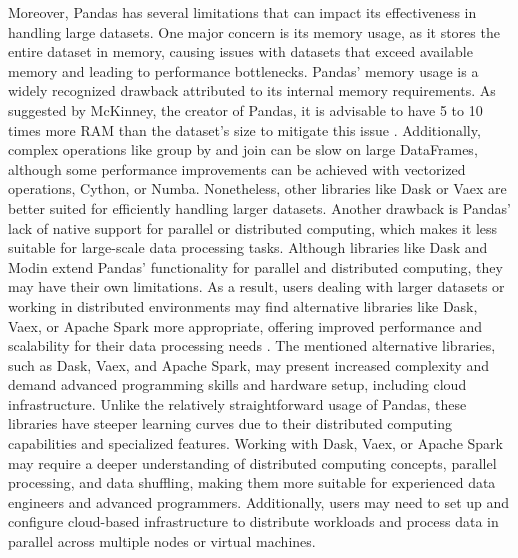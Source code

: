 Moreover, Pandas has several limitations that can impact its effectiveness in handling large datasets. One major concern is its memory usage, as it stores the entire dataset in memory, causing issues with datasets that exceed available memory and leading to performance bottlenecks. Pandas' memory usage is a widely recognized drawback attributed to its internal memory requirements. As suggested by McKinney, the creator of Pandas, it is advisable to have 5 to 10 times more RAM than the dataset's size to mitigate this issue \cite{sinthong2019aframe}. Additionally, complex operations like group by and join can be slow on large DataFrames, although some performance improvements can be achieved with vectorized operations, Cython, or Numba. Nonetheless, other libraries like Dask or Vaex are better suited for efficiently handling larger datasets. Another drawback is Pandas' lack of native support for parallel or distributed computing, which makes it less suitable for large-scale data processing tasks. Although libraries like Dask and Modin extend Pandas' functionality for parallel and distributed computing, they may have their own limitations. As a result, users dealing with larger datasets or working in distributed environments may find alternative libraries like Dask, Vaex, or Apache Spark more appropriate, offering improved performance and scalability for their data processing needs \cite{nelluri2021limitations}. The mentioned alternative libraries, such as Dask, Vaex, and Apache Spark, may present increased complexity and demand advanced programming skills and hardware setup, including cloud infrastructure. Unlike the relatively straightforward usage of Pandas, these libraries have steeper learning curves due to their distributed computing capabilities and specialized features. Working with Dask, Vaex, or Apache Spark may require a deeper understanding of distributed computing concepts, parallel processing, and data shuffling, making them more suitable for experienced data engineers and advanced programmers. Additionally, users may need to set up and configure cloud-based infrastructure to distribute workloads and process data in parallel across multiple nodes or virtual machines.

